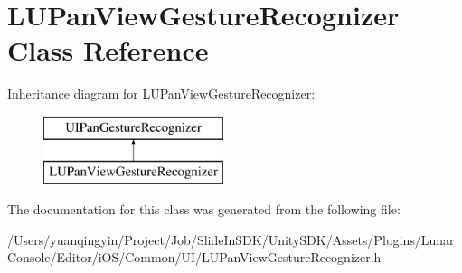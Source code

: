 \hypertarget{interface_l_u_pan_view_gesture_recognizer}{}\section{L\+U\+Pan\+View\+Gesture\+Recognizer Class Reference}
\label{interface_l_u_pan_view_gesture_recognizer}
Inheritance diagram for L\+U\+Pan\+View\+Gesture\+Recognizer\+:\begin{figure}[H]
\begin{center}
\leavevmode
\includegraphics[height=2.000000cm]{interface_l_u_pan_view_gesture_recognizer}
\end{center}
\end{figure}


The documentation for this class was generated from the following file\+:\begin{DoxyCompactItemize}
\item 
/\+Users/yuanqingyin/\+Project/\+Job/\+Slide\+In\+S\+D\+K/\+Unity\+S\+D\+K/\+Assets/\+Plugins/\+Lunar\+Console/\+Editor/i\+O\+S/\+Common/\+U\+I/L\+U\+Pan\+View\+Gesture\+Recognizer.\+h\end{DoxyCompactItemize}
